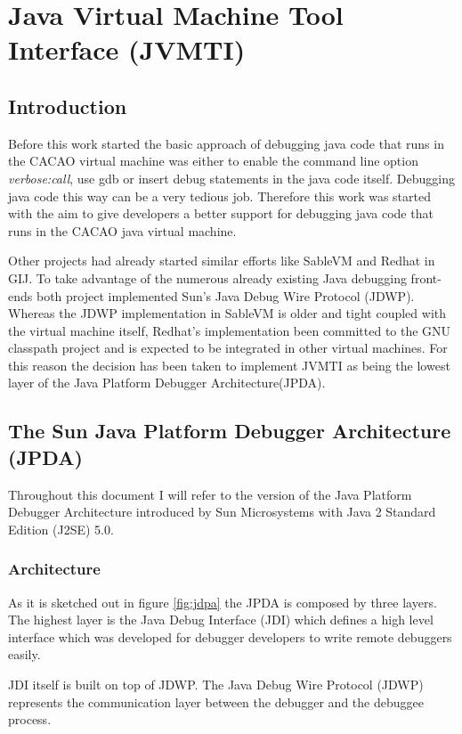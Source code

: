 \chapter{Java Virtual Machine Tool Interface (JVMTI)}
\section{Introduction} %
Before this work started the basic approach of debugging java code that runs in the CACAO virtual machine was either to enable the command line option \textit{verbose:call}, use gdb or insert debug statements in the java code itself. Debugging java code this way can be a very tedious job. Therefore this work was started with the aim to give developers a better support for debugging java code that runs in the CACAO java virtual machine.

Other projects had already started similar efforts like SableVM\cite{sablevm} and Redhat in GIJ\cite{gij}. To take advantage of the numerous already existing Java debugging front-ends both project implemented Sun's Java Debug Wire Protocol (JDWP)\cite{jpda}. Whereas the JDWP implementation in SableVM is older and tight coupled with the virtual machine itself, Redhat's implementation been committed to the GNU classpath project and is expected to be integrated in other virtual machines. For this reason the decision has been taken to implement JVMTI\cite{jvmti} as being the lowest layer of the Java Platform Debugger Architecture(JPDA)\cite{jpda}.

\section{The Sun Java Platform Debugger Architecture (JPDA)} %
Throughout this document I will refer to the version of the Java Platform Debugger Architecture\cite{jpda} introduced by Sun Microsystems with Java 2 Standard Edition (J2SE) 5.0.

\subsection{Architecture} %
As it is sketched out in figure \ref{fig:jdpa} the JPDA is composed by three layers. The highest layer is the Java Debug Interface (JDI) which defines a high level interface which was developed for debugger developers to write remote debuggers easily. 

JDI itself is built on top of JDWP. The Java Debug Wire Protocol (JDWP) represents the communication layer between the debugger and the debuggee process. 


